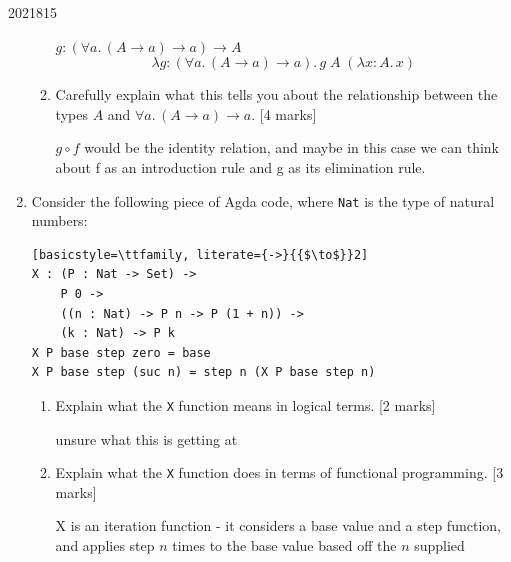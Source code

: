 \documentclass[10pt,\jkfside,a4paper]{article}
\newcommand{\answer}[1]{
    \begin{tcolorbox}[colframe=black, colback=white, sharp corners, boxrule=0.2mm, breakable]
        #1
    \end{tcolorbox}
}
\newcommand{\qmarks}[1]{\hspace*{\fill}[#1]}
\begin{document}
\begin{examquestion}{2021}{8}{15}
\begin{enumerate}
\begin{enumerate}
{                        $g : (\forall a.\, (A \to a) \to a) \to A$
                        \[
                            \lambda g :(\forall a.\, (A \to a) \to a).\, g\;A\;(\lambda x : A.\, x)
                        \]
                    }

                \item
                    Carefully explain what this tells you about the relationship between
                    the types $A$ and $\forall a.\, (A \to a) \to a$. \qmarks{4 marks}

                    \answer{
                        $g \circ f$  would be the identity relation, and maybe in this case we can think about f as an introduction rule and g as its elimination rule.
                    }

            \end{enumerate}

        \item
            Consider the following piece of Agda code, where \texttt{Nat} is the type of
            natural numbers:

\begin{lstlisting}[basicstyle=\ttfamily, literate={->}{{$\to$}}2]
X : (P : Nat -> Set) ->
    P 0 ->
    ((n : Nat) -> P n -> P (1 + n)) ->
    (k : Nat) -> P k
X P base step zero = base
X P base step (suc n) = step n (X P base step n)
\end{lstlisting}

            \begin{enumerate}
                \item
                    Explain what the \texttt{X} function means in logical terms.
                    \qmarks{2 marks}

                    \answer{ 
                        unsure what this is getting at 
                    }


                \item
                    Explain what the \texttt{X} function does in terms of functional
                    programming. \qmarks{3 marks}

                    \answer{ 
                        X is an iteration function - it considers a base value and a step function, and applies step $n$ times to the base value based off the $n$ supplied
                    }

            \end{enumerate}

    \end{enumerate}

\end{examquestion}
\end{document}
